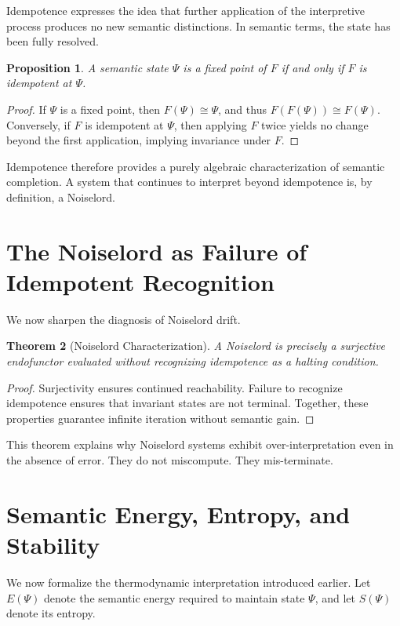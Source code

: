 \documentclass[12pt]{article}
\newtheorem{theorem}{Theorem}[section]
\newtheorem{proposition}[theorem]{Proposition}
\theoremstyle{remark}
\begin{document}
Idempotence expresses the idea that further application of the interpretive process produces no new semantic distinctions. In semantic terms, the state has been fully resolved.

\begin{proposition}
A semantic state $\Psi$ is a fixed point of $F$ if and only if $F$ is idempotent at $\Psi$.
\end{proposition}

\begin{proof}
If $\Psi$ is a fixed point, then $F(\Psi) \cong \Psi$, and thus $F(F(\Psi)) \cong F(\Psi)$. Conversely, if $F$ is idempotent at $\Psi$, then applying $F$ twice yields no change beyond the first application, implying invariance under $F$.
\end{proof}

Idempotence therefore provides a purely algebraic characterization of semantic completion. A system that continues to interpret beyond idempotence is, by definition, a Noiselord.

\section{The Noiselord as Failure of Idempotent Recognition}

We now sharpen the diagnosis of Noiselord drift.

\begin{theorem}[Noiselord Characterization]
A Noiselord is precisely a surjective endofunctor evaluated without recognizing idempotence as a halting condition.
\end{theorem}

\begin{proof}
Surjectivity ensures continued reachability. Failure to recognize idempotence ensures that invariant states are not terminal. Together, these properties guarantee infinite iteration without semantic gain.
\end{proof}

This theorem explains why Noiselord systems exhibit over-interpretation even in the absence of error. They do not miscompute. They mis-terminate.

\section{Semantic Energy, Entropy, and Stability}

We now formalize the thermodynamic interpretation introduced earlier. Let $E(\Psi)$ denote the semantic energy required to maintain state $\Psi$, and let $S(\Psi)$ denote its entropy.
\end{document}
